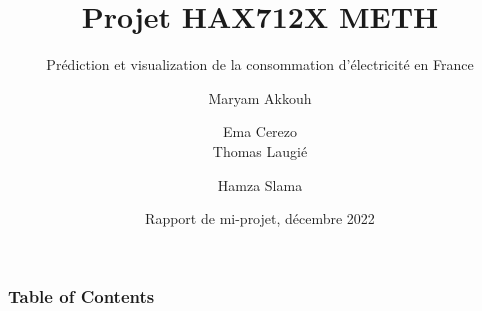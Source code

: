\documentclass[compress, red]{beamer}
\title[Projet HAX712X] %
{Projet HAX712X METH}
\subtitle{Prédiction et visualization de la consommation d'électricité en France}
\author[M. Akkouh, E. Cerezo, T. Laugié, H. Slama] %
{Maryam Akkouh \and Ema Cerezo\\ Thomas Laugié \and Hamza Slama}
\date[VLC 2021] %
{Rapport de mi-projet, décembre 2022}
\begin{document}
\frame{\titlepage}

\begin{frame}
\frametitle{Table of Contents}
\tableofcontents
\end{frame}








\end{document}

